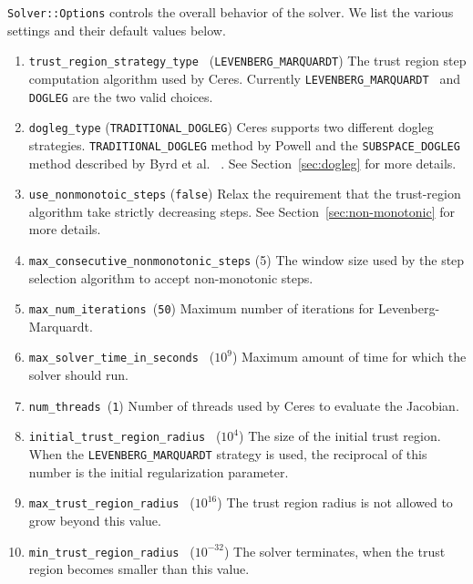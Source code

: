 \texttt{Solver::Options} controls the overall behavior of the
solver. We list the various settings and their default values below.

\begin{enumerate}

\item{\texttt{trust\_region\_strategy\_type }}
  (\texttt{LEVENBERG\_MARQUARDT}) The  trust region step computation
  algorithm used by Ceres. Currently \texttt{LEVENBERG\_MARQUARDT }
  and \texttt{DOGLEG} are the two valid choices.

\item{\texttt{dogleg\_type}} (\texttt{TRADITIONAL\_DOGLEG})  Ceres
  supports two different dogleg strategies.
  \texttt{TRADITIONAL\_DOGLEG} method by Powell and the
  \texttt{SUBSPACE\_DOGLEG} method described by Byrd et al.
~\cite{byrd1988approximate}. See Section~\ref{sec:dogleg} for more details.

\item{\texttt{use\_nonmonotoic\_steps}} (\texttt{false})
Relax the requirement that the trust-region algorithm take strictly
decreasing steps. See Section~\ref{sec:non-monotonic} for more details.

\item{\texttt{max\_consecutive\_nonmonotonic\_steps}} (5)
The window size used by the step selection algorithm to accept
non-monotonic steps.

\item{\texttt{max\_num\_iterations }}(\texttt{50}) Maximum number of
  iterations for Levenberg-Marquardt.

\item{\texttt{max\_solver\_time\_in\_seconds }} ($10^9$) Maximum
  amount of time for which the solver should run.

\item{\texttt{num\_threads }}(\texttt{1}) Number of threads used by
  Ceres to evaluate the Jacobian.

\item{\texttt{initial\_trust\_region\_radius } ($10^4$)} The size of
  the initial trust region. When the \texttt{LEVENBERG\_MARQUARDT}
  strategy is used, the reciprocal of this number is the initial
  regularization parameter.

\item{\texttt{max\_trust\_region\_radius } ($10^{16}$)} The trust
  region radius is not allowed to grow beyond this value.

\item{\texttt{min\_trust\_region\_radius } ($10^{-32}$)} The solver
  terminates, when the trust region becomes smaller than this value.


\end{enumerate}
